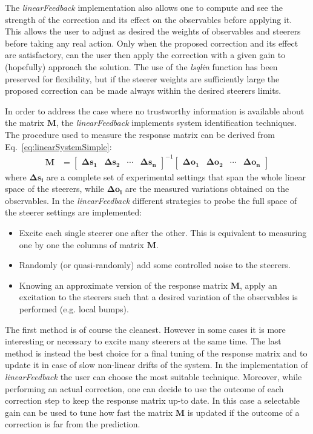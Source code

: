 The \emph{linearFeedback} implementation also allows one to compute and see the strength of the
correction and its effect on the observables before applying it.
This allows the user to adjust as desired the weights of observables and steerers before taking any
real action.
Only when the proposed correction and its effect are satisfactory, can the user then apply the
correction with a given gain to (hopefully) approach the solution.
The use of the \emph{lsqlin} function has been preserved for flexibility, but if the steerer weights
are sufficiently large the proposed correction can be made always within the desired steerers limits.

In order to address the case where no trustworthy information is available about the matrix
$\bm{M}$, the \emph{linearFeedback} implements system identification techniques. 
The procedure used to measure the response matrix can be derived from Eq.~\ref{eq:linearSystemSimple}:
%
\begin{align}
\bm{M}  &=
\begin{bmatrix}
\bm{\Delta s_1} & \bm{\Delta s_2} & \cdots &  \bm{\Delta s_n}
\end{bmatrix}^{-1} 
\begin{bmatrix}
\bm{\Delta o_1} & \bm{\Delta o_2} & \cdots &  \bm{\Delta o_n}
\end{bmatrix}
\label{eq:simplestSystemIdentification}
\end{align}
where $\bm{\Delta s_i}$ are a complete set of experimental settings that span the whole linear
space of the steerers, while $\bm{\Delta o_i}$ are the measured variations obtained on the
observables.
%
In the \emph{linearFeedback} different strategies to probe the full space of the steerer settings are
implemented:
\begin{itemize}
\item
Excite each single steerer one after the other.
This is equivalent to measuring one by one the columns of matrix $\bm{M}$.
\item
Randomly (or quasi-randomly) add some controlled noise to the steerers.
\item
Knowing an approximate version of the response matrix $\bm{M}$, apply an excitation to the
steerers such that a desired variation of the observables is performed (e.g. local bumps).
\end{itemize}
The first method is of course the cleanest. However in some cases it is more interesting or necessary
to excite many steerers at the same time.
The last method is instead the best choice for a final tuning of the response matrix and to update it
in case of slow non-linear drifts of the system.
In the implementation of \emph{linearFeedback} the user can choose the most suitable technique.
Moreover, while performing an actual correction, one can decide to use the outcome of each correction
step to keep the response matrix up-to date.
In this case a selectable gain can be used to tune how fast the matrix $\bm{M}$ is updated if the
outcome of a correction is far from the prediction.


